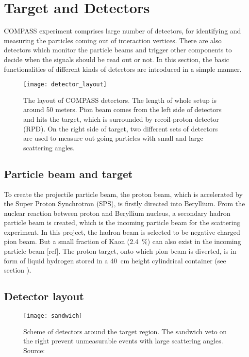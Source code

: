 \section{Target and Detectors}
COMPASS experiment comprises large number of detectors, for identifying and measuring the particles coming out of interaction vertices. There are also detectors which monitor the particle beams and trigger other components to decide when the signals should be read out or not. In this section, the basic functionalities of different kinds of detectors are introduced in a simple manner. 

\begin{figure*}[!ht]
	\centering
	\texttt{[image: detector\_layout]}
	\caption{The layout of COMPASS detectors. The length of whole setup is around 50 meters. Pion beam comes from the left side of detectors and hits the target, which is surrounded by recoil-proton detector (RPD). On the right side of target, two different sets of detectors are used to measure out-going particles with small and large scattering angles.}
	\label{fig:detec_layout}	
\end{figure*}

\subsection{Particle beam and target}
To create the projectile particle beam, the proton beam, which is accelerated by the Super Proton Synchrotron (SPS), is firstly directed into Beryllium. From the nuclear reaction between proton and Beryllium nucleus, a secondary hadron particle beam is created, which is the incoming particle beam for the scattering experiment. In this project, the hadron beam is selected to be negative charged pion beam. But a small fraction of Kaon (\SI{2.4}{\percent}) can also exist in the incoming particle beam [ref]. The proton target, onto which pion beam is diverted, is in form of liquid hydrogen stored in a \SI{40}{\centi\meter} height cylindrical container (see section ). 

\subsection{Detector layout}

\begin{figure}[!th]
	\centering
	\texttt{[image: sandwich]}
	\caption{Scheme of detectors around the target region. The sandwich veto on the right prevent unmeasurable events with large scattering angles. Source: \cite{sandwich}}
	\label{fig:sandwich}
\end{figure}

